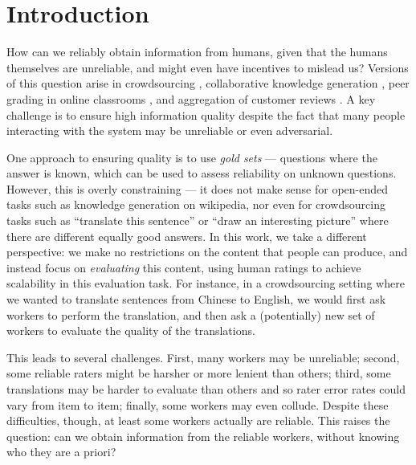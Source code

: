 \section{Introduction}
\label{sec:intro}


How can we reliably obtain information from humans, given that the humans 
themselves are unreliable, and might even have incentives to mislead us?
Versions of this question arise in crowdsourcing \citep{vuurens2011spam}, 
collaborative knowledge generation \citep{priedhorsky2007creating}, peer grading 
in online classrooms \citep{kulkarni2015peer,piech2013tuned}, and aggregation 
of customer reviews \citep{harmon2004amazon}. A key challenge is to ensure 
high information quality despite the fact that many people interacting with 
the system may be unreliable or even adversarial.

One approach to ensuring quality is to use \emph{gold sets} --- questions where 
the answer is known, which can be used to assess reliability on unknown questions. 
However, this is overly constraining --- it does not make sense for open-ended 
tasks such as knowledge generation on wikipedia, nor even for crowdsourcing 
tasks such as ``translate this sentence'' or ``draw an interesting picture'' 
where there are different equally good answers. 
In this work, we take a different perspective: we make no restrictions on the 
content that people can produce, and instead focus on \emph{evaluating} this 
content, using human ratings to achieve scalability in this evaluation task. 
For instance, in a crowdsourcing setting where we wanted to translate sentences 
from Chinese to English, we would first ask workers to perform the translation, 
and then ask a (potentially) new set of workers to evaluate the quality of 
the translations.

This leads to several challenges. First, many workers may be unreliable; 
second, some reliable raters might be harsher or more lenient than others; 
third, some translations may be harder to evaluate than others 
and so rater error rates could vary from item to item; 
finally, some workers may even collude. %
Despite these difficulties, though, at least some workers 
actually are reliable. This raises the question: can we obtain 
information from the reliable workers, without knowing who they are a priori?

